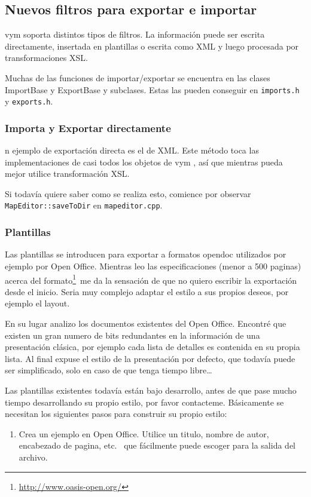 \documentclass{article}
\newcommand{\vym}{{\sc vym }}
\begin{document}
\begin{appendix}
\subsection{Nuevos filtros para exportar e importar}
\vym soporta distintos tipos de filtros. La informaci\'on puede ser escrita directamente, insertada en plantillas o escrita como XML y luego procesada por transformaciones XSL.

Muchas de las funciones de importar/exportar se encuentra en las clases ImportBase y ExportBase y subclases. Estas las pueden conseguir en {\tt imports.h} y {\tt exports.h}.

\subsubsection*{Importa y Exportar directamente}
n ejemplo de exportaci\'on directa es el de XML. Este m\'etodo toca las implementaciones de casi todos los objetos de \vym, as\'i que mientras pueda mejor utilice transformaci\'on XSL.

Si todav\'ia quiere saber como se realiza esto, comience por observar
{\tt MapEditor::saveToDir} en {\tt mapeditor.cpp}.

\subsubsection*{Plantillas}
Las plantillas se introducen para exportar a formatos opendoc utilizados por ejemplo por Open Office. Mientras leo las especificaciones (menor a 500 paginas) acerca del formato\footnote{
\href{http://www.oasis-open.org/}{http://www.oasis-open.org/}}\ 
me da la sensaci\'on de que no quiero escribir la exportaci\'on desde el inicio. Seria muy complejo adaptar el estilo a sus propios deseos, por ejemplo el layout.

En su lugar analizo los documentos existentes del Open Office. Encontr\'e que existen un gran numero de bits redundantes en la informaci\'on de una presentaci\'on cl\'asica, por ejemplo cada lista de detalles es contenida en su propia lista. Al final expuse el estilo de la presentaci\'on por defecto, que todav\'ia puede ser simplificado, solo en caso de que tenga tiempo libre\ldots

Las plantillas existentes todav\'ia est\'an bajo desarrollo, antes de que pase mucho tiempo desarrollando su propio estilo, por favor contacteme. B\'asicamente se necesitan los siguientes pasos para construir su propio estilo:
\begin{enumerate}
	\item Crea un ejemplo en Open Office. Utilice un titulo, nombre de autor, encabezado de pagina, etc. \ que f\'acilmente puede escoger para la salida del archivo.
	

\end{enumerate}
\end{appendix}
\end{document}
